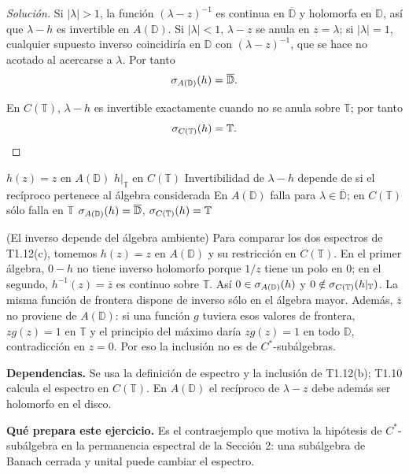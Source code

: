 \begin{proof}[Solución]
Si $|\lambda|>1$, la función $(\lambda-z)^{-1}$ es continua en $\overline{\mathbb D}$ y holomorfa
en $\mathbb D$, así que $\lambda-h$ es invertible en $A(\mathbb D)$. Si $|\lambda|<1$,
$\lambda-z$ se anula en $z=\lambda$; si $|\lambda|=1$, cualquier supuesto inverso coincidiría en
$\mathbb D$ con $(\lambda-z)^{-1}$, que se hace no acotado al acercarse a $\lambda$. Por tanto
\[
 \sigma_{A(\mathbb D)}(h)=\overline{\mathbb D}.
\]

En $C(\mathbb T)$, $\lambda-h$ es invertible exactamente cuando no se anula sobre $\mathbb T$; por
tanto
\[
 \sigma_{C(\mathbb T)}(h)=\mathbb T.
\]
\end{proof}

\proofdiagrambranch
{$h(z)=z$ en $A(\mathbb D)$}
{$h|_{\mathbb T}$ en $C(\mathbb T)$}
{Invertibilidad de $\lambda-h$ depende de si el recíproco pertenece al álgebra considerada}
{En $A(\mathbb D)$ falla para $\lambda\in\overline{\mathbb D}$; en $C(\mathbb T)$ sólo falla en $\mathbb T$}
{$\sigma_{A(\mathbb D)}(h)=\overline{\mathbb D}$, $\sigma_{C(\mathbb T)}(h)=\mathbb T$}

\begin{cthejemplo}{(El inverso depende del álgebra ambiente)}
Para comparar los dos espectros de T1.12(c), tomemos $h(z)=z$ en $A(\mathbb D)$ y
su restricción en $C(\mathbb T)$.
En el primer álgebra, $0-h$ no tiene inverso holomorfo porque $1/z$ tiene un polo en
$0$; en el segundo, $h^{-1}(z)=\overline z$ es continuo sobre $\mathbb T$.
Así $0\in\sigma_{A(\mathbb D)}(h)$ y $0\notin\sigma_{C(\mathbb T)}(h|_{\mathbb T})$.
La misma función de frontera dispone de inverso sólo en el álgebra mayor. Además,
$\overline z$ no proviene de $A(\mathbb D)$: si una función $g$ tuviera esos valores de
frontera, $zg(z)=1$ en $\mathbb T$ y el principio del máximo daría $zg(z)=1$ en todo
$\mathbb D$, contradicción en $z=0$. Por eso la inclusión no es de $C^*$-subálgebras.
\end{cthejemplo}

\noindent\textbf{Dependencias.} Se usa la definición de espectro y la inclusión de T1.12(b); T1.10 calcula el espectro en $C(\mathbb T)$. En $A(\mathbb D)$ el recíproco de $\lambda-z$ debe además ser holomorfo en el disco.

\noindent\textbf{Qué prepara este ejercicio.} Es el contraejemplo que motiva la hipótesis de $C^*$-subálgebra en la permanencia espectral de la Sección 2: una subálgebra de Banach cerrada y unital puede cambiar el espectro.

